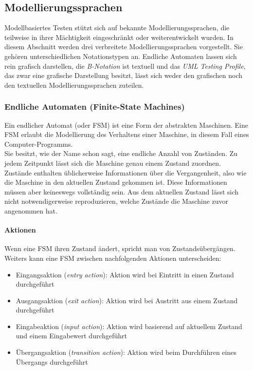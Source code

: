 \subsection{Modellierungssprachen}
\label{sec:notations}

Modellbasiertes Testen stützt sich auf bekannte Modellierungssprachen, die teilweise in ihrer Mächtigkeit eingeschränkt oder weiterentwickelt wurden. In diesem Abschnitt werden drei verbreitete Modellierungssprachen vorgestellt. Sie gehören unterschiedlichen Notationstypen an. Endliche Automaten lassen sich rein grafisch darstellen, die \textit{B-Notation} ist textuell und das \textit{UML Testing Profile}, das zwar eine grafische Darstellung besitzt, lässt sich weder den grafischen noch den textuellen Modellierungssprachen zuteilen.

\subsubsection{Endliche Automaten (Finite-State Machines)}
\label{sec:fsm}
Ein endlicher Automat (oder \Gls{FSM}) ist eine Form der abstrakten Maschinen. Eine \Gls{FSM} erlaubt die Modellierung des Verhaltens einer Maschine, in diesem Fall eines Computer-Programms. \cite{wagner_modeling_2006}\\
Sie besitzt, wie der Name schon sagt, eine endliche Anzahl von Zuständen. Zu jedem Zeitpunkt lässt sich die Maschine genau einem Zustand zuordnen. Zustände enthalten üblicherweise Informationen über die Vergangenheit, also wie die Maschine in den aktuellen Zustand gekommen ist. Diese Informationen müssen aber keineswegs vollständig sein. Aus dem aktuellen Zustand lässt sich nicht notwendigerweise reproduzieren, welche Zustände die Maschine zuvor angenommen hat.\\

\paragraph{Aktionen}
Wenn eine \Gls{FSM} ihren Zustand ändert, spricht man von Zustandsübergängen. Weiters kann eine \Gls{FSM} zwischen nachfolgenden Aktionen unterscheiden:
\begin{itemize}
\item Eingangsaktion (\textit{entry action}): Aktion wird bei Eintritt in einen Zustand durchgeführt
\item Ausgangsaktion (\textit{exit action}): Aktion wird bei Austritt aus einem Zustand durchgeführt
\item Eingabeaktion (\textit{input action}): Aktion wird basierend auf aktuellem Zustand und einem Eingabewert durchgeführt
\item Übergangsaktion (\textit{transition action}): Aktion wird beim Durchführen eines Übergangs durchgeführt
\end{itemize}

